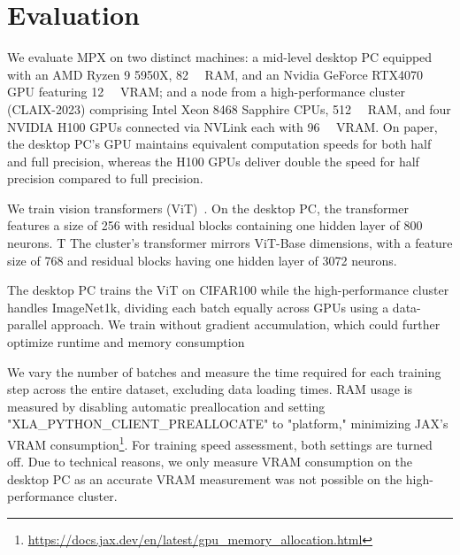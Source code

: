 \documentclass[copyright, logo]{dsme}
\newcommand{\mpx}{\textsc{MPX}}
\begin{document}
\section{Evaluation}
We evaluate \mpx{} on two distinct machines: a mid-level desktop PC equipped with an AMD Ryzen 9 5950X, \qty{82}{\giga\byte} RAM, and an Nvidia GeForce RTX4070 GPU featuring \qty{12}{\giga\byte} VRAM; and a node from a high-performance cluster (CLAIX-2023) comprising Intel Xeon 8468 Sapphire CPUs, \qty{512}{\giga\byte} RAM, and four NVIDIA H100 GPUs connected via NVLink each with \qty{96}{\giga\byte} VRAM. 
On paper, the desktop PC's GPU maintains equivalent computation speeds for both half and full precision, whereas the H100 GPUs deliver double the speed for half precision compared to full precision.

We train vision transformers (ViT)~\citep{dosovitskiy2020image,steiner2021train}. On the desktop PC, the transformer features a size of 256 with residual blocks containing one hidden layer of 800 neurons. T
The cluster's transformer mirrors ViT-Base dimensions, with a feature size of 768 and residual blocks having one hidden layer of 3072 neurons.

The desktop PC trains the ViT on CIFAR100 while the high-performance cluster handles ImageNet1k, dividing each batch equally across GPUs using a data-parallel approach. We train without gradient accumulation, which could further optimize runtime and memory consumption

We vary the number of batches and measure the time required for each training step across the entire dataset, excluding data loading times. 
RAM usage is measured by disabling automatic preallocation and setting "XLA\_PYTHON\_CLIENT\_PREALLOCATE" to "platform," minimizing JAX's VRAM consumption\footnote{\url{https://docs.jax.dev/en/latest/gpu_memory_allocation.html}}. 
For training speed assessment, both settings are turned off.
Due to technical reasons, we only measure VRAM consumption on the desktop PC as an accurate VRAM measurement was not possible on the high-performance cluster. 
\end{document}
